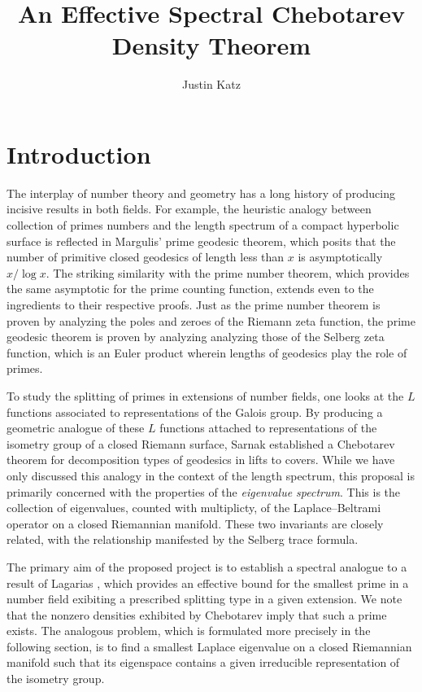 \documentclass[11pt]{article}
\title{An Effective Spectral Chebotarev Density Theorem }
\author{Justin Katz}
\begin{document}
\maketitle
\section{Introduction}

The interplay of number theory and geometry has a long history of producing incisive results in both fields. For example, the heuristic analogy between collection of primes numbers and the length spectrum of a compact hyperbolic surface is reflected in Margulis'  \cite{Margulis1969} prime geodesic theorem, which posits that the number of primitive closed geodesics of length less than $x$ is asymptotically  $x/\log x$. The striking similarity with the prime number theorem, which provides the same asymptotic for the prime counting function, extends even to the ingredients to their respective proofs. Just as the prime number theorem is proven by analyzing the poles and zeroes of the Riemann zeta function, the prime geodesic theorem is proven by analyzing analyzing those of the Selberg zeta function, which is an Euler product wherein lengths of geodesics play the role of primes. 

To study the splitting of primes in extensions of number fields, one looks at the $L$ functions associated to representations of the Galois group. By producing a geometric analogue of these $L$ functions attached to representations of the isometry group of a closed Riemann surface, Sarnak \cite{sarnak1982} established a Chebotarev theorem for decomposition types of geodesics in lifts to covers. 
While we have only discussed this analogy in the context of the length spectrum, this proposal is primarily concerned with the properties of the \emph{eigenvalue spectrum}. This is the collection of eigenvalues, counted with multiplicty, of the Laplace--Beltrami operator on a closed Riemannian manifold. These two invariants are closely related, with the relationship manifested by the Selberg trace formula.
 
The primary aim of the proposed project is to establish a spectral analogue to a result of Lagarias \cite{lagarias1979}, which provides an effective bound for the smallest prime in a number field exibiting a prescribed splitting type in a given extension. We note that the nonzero densities exhibited by Chebotarev imply that such a prime exists. The analogous problem, which is formulated more precisely in the following section, is to find a smallest Laplace eigenvalue on a closed Riemannian manifold such that its eigenspace contains a given irreducible representation of the isometry group. 
\end{document}
